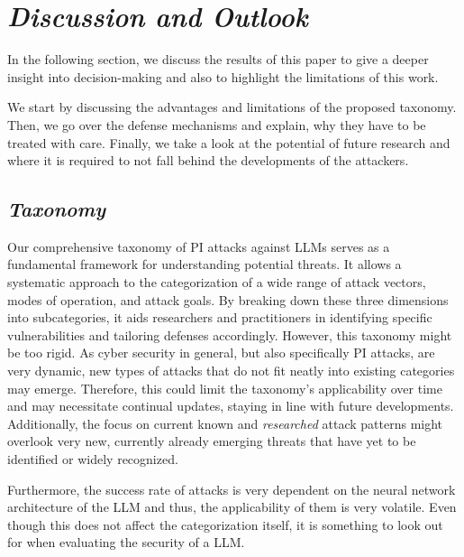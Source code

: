 \section{\textit{Discussion and Outlook}}
In the following section, we discuss the results of this paper to give a deeper insight into decision-making and also to highlight the limitations of this work.

We start by discussing the advantages and limitations of the proposed taxonomy. 
Then, we go over the defense mechanisms and explain, why they have to be treated with care.
Finally, we take a look at the potential of future research and where it is required to not fall behind the developments of the attackers.

\subsection{\textit{Taxonomy}}
\label{subsec:tax}
Our comprehensive taxonomy of PI attacks against LLMs serves as a fundamental framework for understanding potential threats.
It allows a systematic approach to the categorization of a wide range of attack vectors, modes of operation, and attack goals.
By breaking down these three dimensions into subcategories, it aids researchers and practitioners in identifying specific vulnerabilities and tailoring defenses accordingly. 
However, this taxonomy might be too rigid. As cyber security in general, but also specifically PI attacks, are very dynamic, new types of attacks that do not fit neatly into existing categories may emerge. 
Therefore, this could limit the taxonomy's applicability over time and may necessitate continual updates, staying in line with future developments. 
Additionally, the focus on current known and \textit{researched} attack patterns might overlook very new, currently already emerging threats that have yet to be identified or widely recognized.

Furthermore, the success rate of attacks is very dependent on the neural network architecture of the LLM \cite{perez2022ignore, liu2023prompt, 10.1145/3605764.3623985} and thus, the applicability of them is very volatile. Even though this does not affect the categorization itself, it is something to look out for when evaluating the security of a LLM. 

